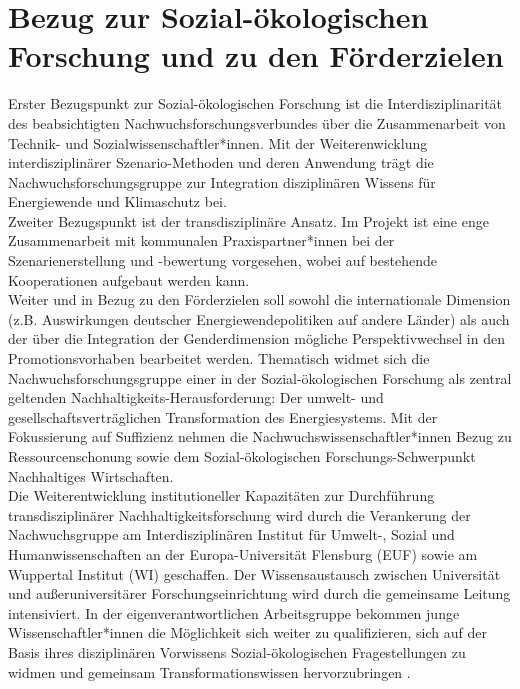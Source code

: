 \documentclass[a4paper,11pt,twoside]{scrartcl}
\begin{document}
\section{Bezug zur Sozial-ökologischen Forschung und zu den Förderzielen}
Erster Bezugspunkt zur Sozial-ökologischen Forschung ist die Interdisziplinarität des beabsichtigten Nachwuchsforschungsverbundes über die Zusammenarbeit von Technik- und Sozialwissenschaftler*innen. Mit der Weiterenwicklung interdisziplinärer Szenario-Methoden und deren Anwendung trägt die Nachwuchsforschungsgruppe zur Integration disziplinären Wissens für Energiewende und Klimaschutz bei.\\
Zweiter Bezugspunkt ist der transdisziplinäre Ansatz. Im Projekt ist eine enge Zusammenarbeit mit kommunalen Praxispartner*innen bei der Szenarienerstellung und -bewertung vorgesehen, wobei auf bestehende Kooperationen aufgebaut werden kann.\\
Weiter und in Bezug zu den Förderzielen soll sowohl die internationale Dimension (z.B. Auswirkungen deutscher Energiewendepolitiken auf andere Länder) als auch der über die Integration der Genderdimension mögliche Perspektivwechsel in den Promotionsvorhaben bearbeitet werden. Thematisch widmet sich die Nachwuchsforschungsgruppe einer in der Sozial-ökologischen Forschung als zentral geltenden Nachhaltigkeits-Herausforderung: Der umwelt- und gesellschaftsverträglichen Transformation des Energiesystems. Mit der Fokussierung auf Suffizienz nehmen die Nachwuchswissenschaftler*innen Bezug zu Ressourcenschonung sowie dem Sozial-ökologischen Forschungs-Schwerpunkt Nachhaltiges Wirtschaften.\\
Die Weiterentwicklung institutioneller Kapazitäten zur Durchführung transdisziplinärer Nachhaltigkeitsforschung wird durch die Verankerung der Nachwuchsgruppe am Interdisziplinären Institut für Umwelt-, Sozial und Humanwissenschaften an der Europa-Universität Flensburg (EUF) sowie am Wuppertal Institut (WI) geschaffen. Der Wissensaustausch zwischen Universität und außeruniversitärer Forschungseinrichtung wird durch die gemeinsame Leitung intensiviert. In der eigenverantwortlichen Arbeitsgruppe bekommen junge Wissenschaftler*innen die Möglichkeit sich weiter zu qualifizieren, sich auf der Basis ihres disziplinären Vorwissens Sozial-ökologischen Fragestellungen zu widmen und gemeinsam Transformationswissen hervorzubringen \cite{Schneidewind2014}.
\end{document}

